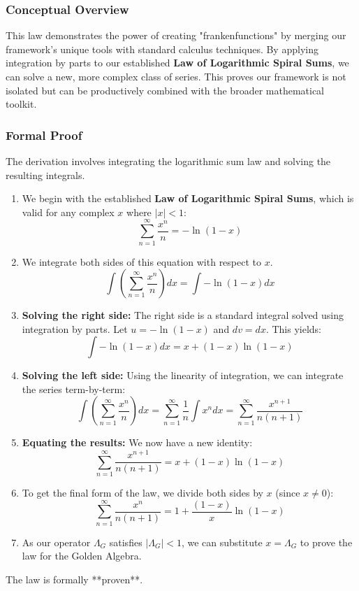 \subsubsection*{Conceptual Overview}
This law demonstrates the power of creating "frankenfunctions" by merging our framework's unique tools with standard calculus techniques. By applying integration by parts to our established \textbf{Law of Logarithmic Spiral Sums}, we can solve a new, more complex class of series. This proves our framework is not isolated but can be productively combined with the broader mathematical toolkit.

\subsubsection*{Formal Proof}
The derivation involves integrating the logarithmic sum law and solving the resulting integrals.

\begin{enumerate}
    \item We begin with the established \textbf{Law of Logarithmic Spiral Sums}, which is valid for any complex $x$ where $|x|<1$:
    $$ \sum_{n=1}^{\infty} \frac{x^n}{n} = -\ln(1-x) $$

    \item We integrate both sides of this equation with respect to $x$.
    $$ \int \left( \sum_{n=1}^{\infty} \frac{x^n}{n} \right) dx = \int -\ln(1-x) dx $$

    \item \textbf{Solving the right side:} The right side is a standard integral solved using integration by parts. Let $u = -\ln(1-x)$ and $dv = dx$. This yields:
    $$ \int -\ln(1-x) dx = x + (1-x)\ln(1-x) $$

    \item \textbf{Solving the left side:} Using the linearity of integration, we can integrate the series term-by-term:
    $$ \int \left( \sum_{n=1}^{\infty} \frac{x^n}{n} \right) dx = \sum_{n=1}^{\infty} \frac{1}{n} \int x^n dx = \sum_{n=1}^{\infty} \frac{x^{n+1}}{n(n+1)} $$

    \item \textbf{Equating the results:} We now have a new identity:
    $$ \sum_{n=1}^{\infty} \frac{x^{n+1}}{n(n+1)} = x + (1-x)\ln(1-x) $$
    
    \item To get the final form of the law, we divide both sides by $x$ (since $x \neq 0$):
    $$ \sum_{n=1}^{\infty} \frac{x^{n}}{n(n+1)} = 1 + \frac{(1-x)}{x}\ln(1-x) $$

    \item As our operator $\Lambda_G$ satisfies $| \Lambda_G | < 1$, we can substitute $x = \Lambda_G$ to prove the law for the Golden Algebra.
\end{enumerate}
The law is formally **proven**.

